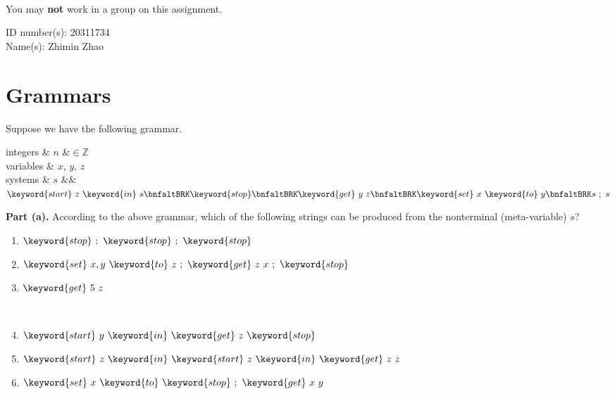 
\gdef\lecturenumber{a1}
\gdef\subsectioncounters{1}




\date{due: Thursday, 2022--07--09, 11:59 pm}

~\\[-7ex]

{\noindent You} may \textbf{not} work in a group on this assignment.

\medskip

{\noindent ID number(s)}: 20311734\\[1ex]
{\noindent Name(s)}: Zhimin Zhao

\vspace*{1ex}

\section{Grammars}

Suppose we have the following grammar.

\begin{grammar}
  integers
  &
  $n$
  &$\in \mathbb{Z}$
\\
  variables
  &
  $x$, $y$, $z$
\\
  systems
  &
  $s$ 
  &\bnfas&
  $
  \keyword{start}~z~\keyword{in}~s
  \bnfaltBRK
  \keyword{stop}
  \bnfaltBRK
  \keyword{get}~y~z
  \bnfaltBRK
  \keyword{set}~x~\keyword{to}~y
  \bnfaltBRK
  s~;~s
  $
\end{grammar}

\textbf{Part (a).} According to the above grammar, which of the following strings can be produced from the
nonterminal (meta-variable) $s$?  

\begin{minipage}[t]{0.47\linewidth}
\begin{enumerate}
\item $\keyword{stop}~;~\keyword{stop}~;~\keyword{stop}$
\item $\keyword{set}~x, y~\keyword{to}~z~;~\keyword{get}~z~x~;~\keyword{stop}$
\item $\keyword{get}~5~z$
\end{enumerate}
\end{minipage}
~
\begin{minipage}[t]{0.47\linewidth}
\begin{enumerate}
  \setcounter{enumi}{3}
\item $\keyword{start}~y~\keyword{in}~\keyword{get}~z~\keyword{stop}$
\item $\keyword{start}~z~\keyword{in}~\keyword{start}~z~\keyword{in}~\keyword{get}~z~z$
\item $\keyword{set}~x~\keyword{to}~\keyword{stop}~;~\keyword{get}~x~y$
\end{enumerate}
\end{minipage}

